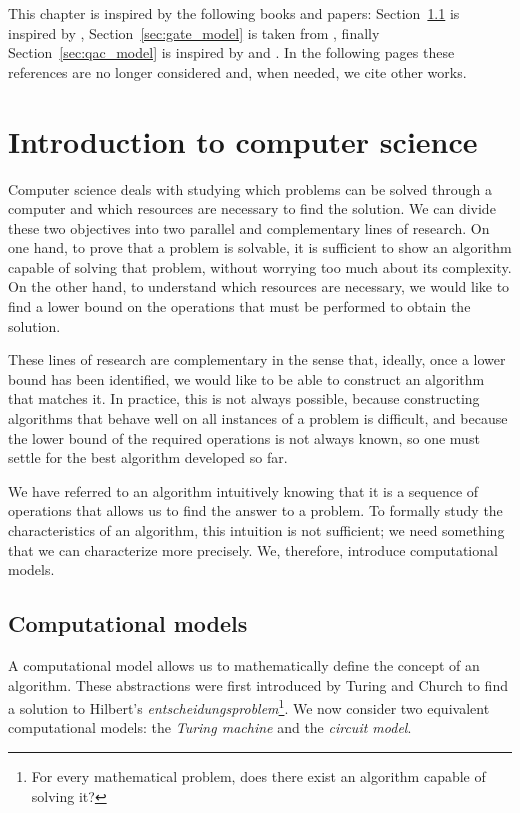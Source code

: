 This chapter is inspired by the following books and papers: Section~\ref{sec:complexity} is inspired by \cite[chapter $3$ and $4$]{nielsen2010quantum}, Section~\ref{sec:gate_model} is taken from \cite[chapter $2$, $3$,$4$ and $7$]{nielsen2010quantum}, finally Section~\ref{sec:qac_model} is inspired by \cite[chaper $2$ and $3$]{mcgeoch2022adiabatic} and \cite{k2005transverse}. In the following pages these references are no longer considered and, when needed, we cite other works.

\section{Introduction to computer science}
Computer science deals with studying which problems can be solved through a computer and which resources are necessary to find the solution. We can divide these two objectives into two parallel and complementary lines of research. On one hand, to prove that a problem is solvable, it is sufficient to show an algorithm capable of solving that problem, without worrying too much about its complexity. On the other hand, to understand which resources are necessary, we would like to find a lower bound on the operations that must be performed to obtain the solution.

These lines of research are complementary in the sense that, ideally, once a lower bound has been identified, we would like to be able to construct an algorithm that matches it. In practice, this is not always possible, because constructing algorithms that behave well on all instances of a problem is difficult, and because the lower bound of the required operations is not always known, so one must settle for the best algorithm developed so far.

We have referred to an algorithm intuitively knowing that it is a sequence of operations that allows us to find the answer to a problem. To formally study the characteristics of an algorithm, this intuition is not sufficient; we need something that we can characterize more precisely. We, therefore, introduce computational models.
\subsection{Computational models}
\label{sec:complexity}
A computational model allows us to mathematically define the concept of an algorithm. These abstractions were first introduced by Turing and Church to find a solution to Hilbert's \emph{entscheidungsproblem}\footnote{For every mathematical problem, does there exist an algorithm capable of solving it?}. We now consider two equivalent computational models: the \emph{Turing machine} and the \emph{circuit model}. 
